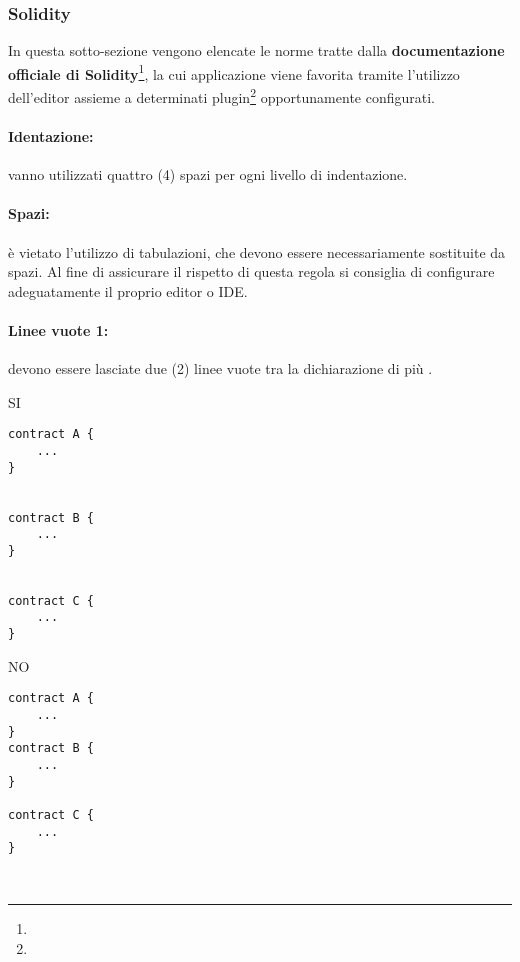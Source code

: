 \documentclass[../ProcessiPrimari.tex]{subfiles}
\begin{document}
	
\subsubsection{Solidity}
In questa sotto-sezione vengono elencate le norme tratte dalla \textbf{documentazione officiale di Solidity}\footnote{}, la cui applicazione viene favorita tramite l'utilizzo dell'editor  assieme a determinati plugin\footnote{} opportunamente configurati.
\paragraph*{Identazione: }
vanno utilizzati quattro (4) spazi per ogni livello di indentazione.
\paragraph*{Spazi: }
è vietato l'utilizzo di tabulazioni, che devono essere necessariamente sostituite da spazi. Al fine di assicurare il rispetto di questa regola si consiglia di configurare adeguatamente il proprio editor o IDE.
\paragraph*{Linee vuote 1: }
devono essere lasciate due (2) linee vuote tra la dichiarazione di più .
\begin{center}{
\begin{minipage}{6cm}
{\begin{center}SI\end{center}}
\begin{Verbatim}[frame=single]
contract A {
    ...
}


contract B {
    ...
}


contract C {
    ...
}
\end{Verbatim}
\end{minipage}
\hfil
\begin{minipage}{6cm}
{\begin{center}NO\end{center}}
\begin{Verbatim}[frame=single]
contract A {
    ...
}
contract B {
    ...
}

contract C {
    ...
}



\end{Verbatim}
\end{minipage}
}
\end{center}
\end{document}
